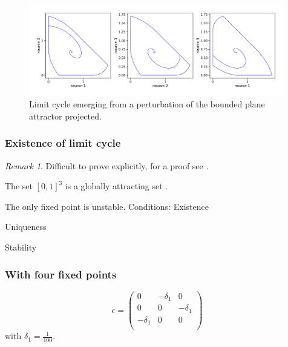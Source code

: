 \documentclass{article}
\theoremstyle{definition}
\theoremstyle{remark}
\newtheorem{remark}{Remark}
\begin{document}
\begin{figure}[H]
    \centering
    \includegraphics[width=0.99\textwidth]{figures/bpa3_limitcycle_2dproj.pdf}
    \caption{Limit cycle emerging from a perturbation of the bounded plane attractor projected.}
    \label{fig:bla3_limitcycle_single_2d}
\end{figure}


\subsubsection{Existence of limit cycle}
\begin{remark}
Difficult to prove explicitly, for a proof see \citep{bel2021}.
\end{remark}


The set $[0,1]^3$ is a globally attracting set \citep[Lemma 2.1]{morrisonDiversityEmergentDynamics}.

The only fixed point is unstable.
Conditions:
Existence %

Uniqueness

Stability


\subsubsection{With four fixed points}
\begin{equation}
\epsilon = 
\begin{pmatrix}
 0  &  -\delta_1 &  0 \\
 0  &  0 & -\delta_1 \\
-\delta_1 & 0 & 0 \\
\end{pmatrix}
\end{equation}
with $\delta_1=\tfrac{1}{100}$.
\end{document}
